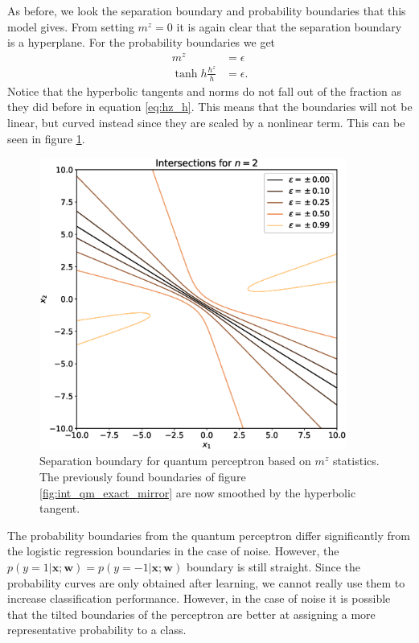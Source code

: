 \noindent As before, we look the separation boundary and probability boundaries that this model gives. From setting $m^z=0$ it is again clear that the separation boundary is a hyperplane. For the probability boundaries we get
\begin{align*}
    m^z &= \epsilon\\
    \tanh{h}\frac{h^z}{h} &= \epsilon.
\end{align*}
Notice that the hyperbolic tangents and norms do not fall out of the fraction as they did before in equation \ref{eq:hz_h}. This means that the boundaries will not be linear, but curved instead since they are scaled by a nonlinear term. This can be seen in figure \ref{fig:int_tanh}.
\begin{figure}[htb!]
    \centering
    \includegraphics[width=0.9\textwidth]{figures/chapter3/intersections_qm_tanh.eps}
    \caption{Separation boundary for quantum perceptron based on $m^z$ statistics. The previously found boundaries of figure \ref{fig:int_qm_exact_mirror} are now smoothed by the hyperbolic tangent.}
    \label{fig:int_tanh}
\end{figure}
The probability boundaries from the quantum perceptron differ significantly from the logistic regression boundaries in the case of noise. However, the $p(y=1|\mathbf{x};\mathbf{w})=p(y=-1|\mathbf{x};\mathbf{w})$ boundary is still straight. Since the probability curves are only obtained after learning, we cannot really use them to increase classification performance. However, in the case of noise it is possible that the tilted boundaries of the perceptron are better at assigning a more representative probability to a class.

